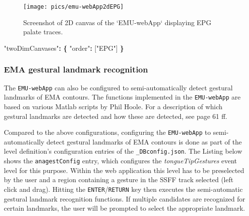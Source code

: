 \documentclass[]{book}
\newenvironment{Shaded}{\begin{snugshade}}{\end{snugshade}}
\newcommand{\NormalTok}[1]{#1}
\newcommand{\OperatorTok}[1]{\textcolor[rgb]{0.81,0.36,0.00}{\textbf{#1}}}
\newcommand{\StringTok}[1]{\textcolor[rgb]{0.31,0.60,0.02}{#1}}
\begin{document}
\begin{figure}

{\centering \texttt{[image: pics/emu-webApp2dEPG]} 

}

\caption{Screenshot of 2D canvas of the `EMU-webApp` displaying EPG palate traces.}\label{fig:webApp-2dEPG}
\end{figure}

\begin{Shaded}
\begin{Highlighting}[]
\StringTok{"twoDimCanvases"}\OperatorTok{:} \OperatorTok{\{}
    \StringTok{"order"}\OperatorTok{:}\NormalTok{ [}\StringTok{"EPG"}\NormalTok{]}
\OperatorTok{\}}
\end{Highlighting}
\end{Shaded}

\hypertarget{ema-gestural-landmark-recognition}{%
\subsubsection*{EMA gestural landmark recognition}\label{ema-gestural-landmark-recognition}}

The \texttt{EMU-webApp} can also be configured to semi-automatically detect gestural landmarks of EMA contours. The functions implemented in the \texttt{EMU-webApp} are based on various Matlab scripts by Phil Hoole. For a description of which gestural landmarks are detected and how these are detected, see \citet{bombien:2011aa} page 61 ff.

Compared to the above configurations, configuring the \texttt{EMU-webApp} to semi-automatically detect gestural landmarks of EMA contours is done as part of the level definition's configuration entries of the \texttt{\_DBconfig.json}. The Listing below shows the \texttt{anagestConfig} entry, which configures the \emph{tongueTipGestures} event level for this purpose. Within the web application this level has to be preselected by the user and a region containing a gesture in the SSFF track selected (left click and drag). Hitting the \texttt{ENTER}/\texttt{RETURN} key then executes the semi-automatic gestural landmark recognition functions. If multiple candidates are recognized for certain landmarks, the user will be prompted to select the appropriate landmark.
\end{document}
